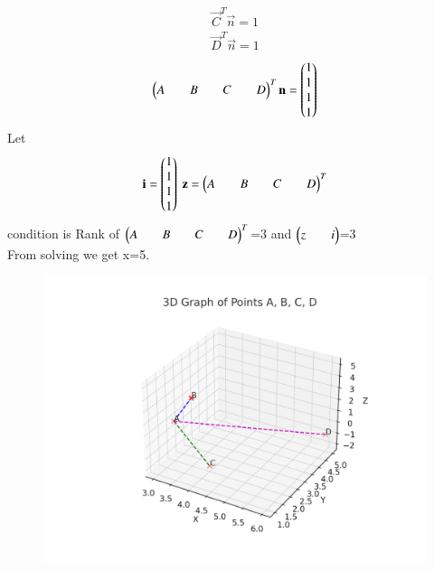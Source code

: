 \documentclass[journal]{IEEEtran}
\begin{document}
\begin{align}
    \vec{C}^T\vec{n}=1
\end{align}
\begin{align}
    \vec{D}^T\vec{n}=1
\end{align}
\begin{align}
    \begin{myvec}{A&&B&&C&&D}^T\end{myvec}\vec{n}=\begin{myvec}{1\\1\\1\\1}\end{myvec}
\end{align}
Let 
\begin{align}
    \vec{i}=\myvec{1\\1\\1\\1}\
    \vec{z}=\begin{myvec}{A&&B&&C&&D}^T\end{myvec}
\end{align}
condition is Rank of $\begin{myvec}{A&&B&&C&&D}^T\end{myvec}$=3
and $\begin{myvec}{z&&i}\end{myvec}$=3\\
From solving we get x=5.

\begin{figure}[h!]
    \centering
    \includegraphics[height=0.5\textheight, keepaspectratio]{figs/3D_points_plot.png}
    \label{figure_1}
\end{figure}
 
\end{document}
